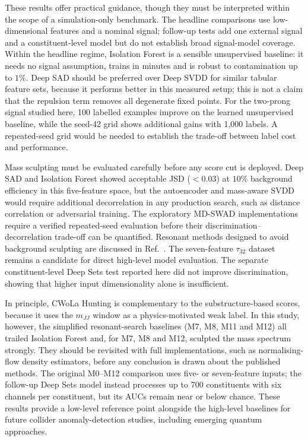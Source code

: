\documentclass[11pt,a4paper]{article}
\newcommand{\mjj}{m_{JJ}}
\newcommand{\tauthree}{\tau_{32}}
\begin{document}
These results offer practical guidance, though they must be interpreted within the
scope of a simulation-only benchmark. The headline comparisons use low-dimensional
features and a nominal signal; follow-up tests add one external signal and a
constituent-level model but do not establish broad signal-model coverage. Within the
headline regime,
Isolation Forest is a sensible unsupervised baseline: it
needs no signal assumption, trains in minutes and is robust to contamination
up to $1\%$. Deep SAD should be preferred over Deep SVDD for similar tabular feature sets,
because it performs better in this measured setup; this is not a claim that
the repulsion term removes all degenerate fixed points.
For the two-prong signal studied here, 100 labelled examples improve on the
learned unsupervised baseline, while the seed-42 grid shows additional gains
with 1,000 labels. A repeated-seed grid would be needed to establish the
trade-off between label cost and performance.

Mass sculpting must be evaluated carefully before any score cut is deployed. Deep SAD and
Isolation Forest showed acceptable JSD ($< 0.03$) at $10\%$ background efficiency in this
five-feature space, but the autoencoder and mass-aware SVDD would require additional
decorrelation in any production search, such as distance correlation\cite{Kasieczka2020}
or adversarial training.\cite{Louppe2017,Shimmin2017} The exploratory MD-SWAD
implementations require a verified repeated-seed evaluation before their
discrimination--decorrelation trade-off can be quantified.
Resonant methods designed to avoid background sculpting are discussed in
Ref.~. The seven-feature $\tauthree$ dataset remains a
candidate for direct high-level model evaluation. The separate constituent-level
Deep Sets test reported here did not improve discrimination, showing that higher
input dimensionality alone is insufficient.

In principle, CWoLa Hunting is complementary to the substructure-based scores, because it uses the
$\mjj$ window as a physics-motivated weak label. In this study, however, the simplified
resonant-search baselines (M7, M8, M11 and M12) all trailed Isolation Forest and, for M7, M8 and M12,
sculpted the mass spectrum strongly. They should be revisited with full implementations,
such as normalising-flow density estimators, before any conclusion is drawn about the published methods.
The original M0--M12 comparison uses five- or seven-feature inputs; the follow-up
Deep Sets model instead processes up to 700 constituents with six channels per
constituent, but its AUCs remain near or below chance. These results provide a
low-level reference point alongside the high-level baselines for future collider
anomaly-detection studies, including emerging quantum approaches.\cite{Ngairangbam2022,Alvi2023}
\end{document}
